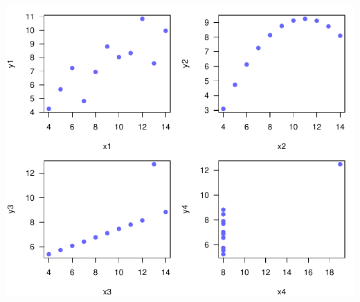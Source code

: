 \documentclass[12pt]{beamer}\usepackage[]{graphicx}\usepackage[]{color}
\newenvironment{knitrout}{}{} %
\begin{document}

\begin{frame}[fragile]
\frametitle{}

\begin{knitrout}\footnotesize
{}\color{fgcolor}

{\centering \includegraphics[width=.9\linewidth,height=.7\linewidth]{figure/unnamed-chunk-7-1} 

}



\end{knitrout}

\end{frame}


\begin{frame}
\begin{center}
\Huge{}
\end{center}
\end{frame}

\end{document}
